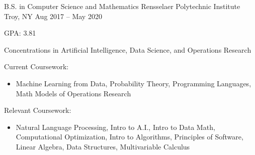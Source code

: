 


\begin{cventries}

  \cventry
  {B.S. in Computer Science and Mathematics}
  {Rensselaer Polytechnic Institute}
  {Troy, NY}
  {Aug 2017 -- May 2020}
  {
    \begin{cvitems}
      \item GPA: 3.81
      \item Concentrations in Artificial Intelligence, Data Science, and Operations Research
      \item Current Coursework:
      \begin{itemize}
        \item Machine Learning from Data, Probability Theory, Programming Languages, Math Models of Operations Research
      \end{itemize}
      \item Relevant Coursework:
      \begin{itemize}
        \item Natural Language Processing, Intro to A.I., Intro to Data Math, Computational Optimization, Intro to Algorithms, \newline Principles of Software, Linear Algebra, Data Structures, Multivariable Calculus
      \end{itemize}
    \end{cvitems}
  }


\end{cventries}